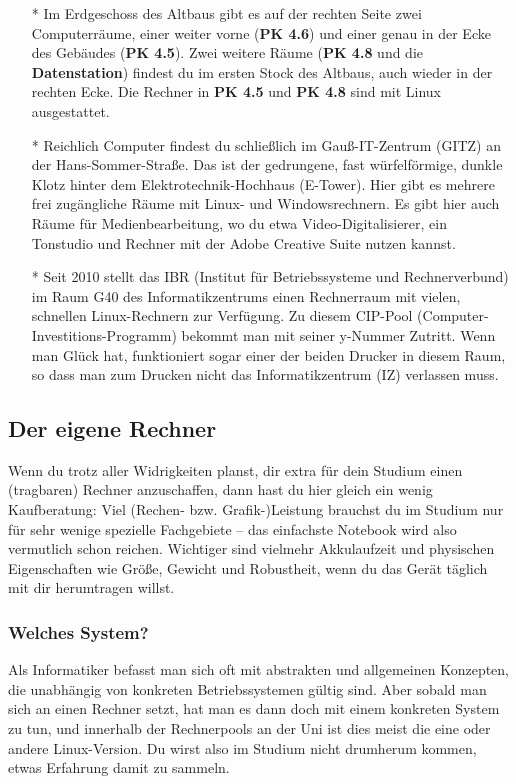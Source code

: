 			\begin{itemize}
				\item[*] Im Erdgeschoss des Altbaus gibt es auf der rechten Seite zwei Computerräume, einer weiter vorne (\textbf{PK 4.6}) und einer genau in der Ecke des Gebäudes (\textbf{PK 4.5}). Zwei weitere Räume (\textbf{PK 4.8} und die \textbf{Datenstation}) findest du im ersten Stock des Altbaus, auch wieder in der rechten Ecke. Die Rechner in \textbf{PK 4.5} und \textbf{PK 4.8} sind mit Linux ausgestattet.

				\item[*] Reichlich Computer findest du schließlich im Gauß-IT-Zentrum (GITZ) an der Hans-Sommer-Straße. Das ist der gedrungene, fast würfelförmige, dunkle Klotz hinter dem Elektrotechnik-Hochhaus (E-Tower). Hier gibt es mehrere frei zugängliche Räume mit Linux- und Windowsrechnern. Es gibt hier auch Räume für Medienbearbeitung, wo du etwa Video-Digitalisierer, ein Tonstudio und Rechner mit der Adobe Creative Suite nutzen kannst.

				\item[*] Seit 2010 stellt das IBR (Institut für Betriebssysteme und Rechnerverbund) im Raum G40 des Informatikzentrums einen Rechnerraum mit vielen, schnellen Linux-Rechnern  zur Verfügung. Zu diesem CIP-Pool (Computer-Investitions-Programm) bekommt man mit seiner y-Nummer Zutritt. Wenn man Glück hat, funktioniert sogar einer der beiden Drucker in diesem Raum, so dass man zum Drucken nicht das Informatikzentrum (IZ) verlassen muss.
			\end{itemize}

		\subsection{Der eigene Rechner}
			Wenn du trotz aller Widrigkeiten planst, dir extra für dein Studium einen (tragbaren) Rechner anzuschaffen, dann hast du hier gleich ein wenig Kaufberatung: Viel (Rechen- bzw. Grafik-)Leistung brauchst du im Studium  nur für sehr wenige spezielle Fachgebiete -- das einfachste Notebook wird also vermutlich schon reichen. Wichtiger sind vielmehr Akkulaufzeit und physischen Eigenschaften wie Größe, Gewicht und Robustheit, wenn du das Gerät täglich mit dir herumtragen willst.

		\subsubsection{Welches System?}
Als Informatiker befasst man sich oft mit abstrakten und allgemeinen Konzepten, die unabhängig von konkreten Betriebssystemen gültig sind. Aber sobald man sich an einen Rechner setzt, hat man es dann doch mit einem konkreten System zu tun, und innerhalb der Rechnerpools an der Uni ist dies meist die eine oder andere Linux-Version. Du wirst also im Studium nicht drumherum kommen, etwas Erfahrung damit zu sammeln.

